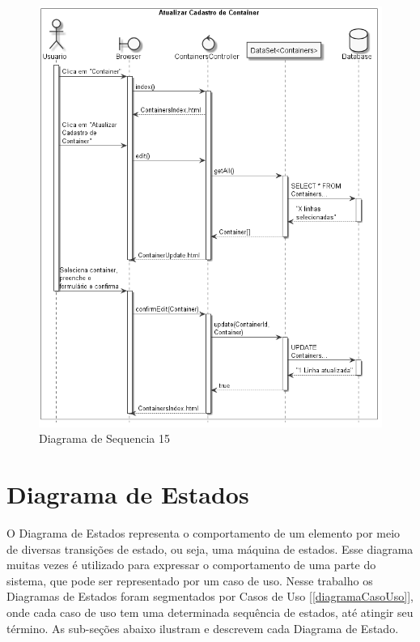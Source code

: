 \documentclass[rascunho,xindy,acronym,symbols]{fei}
\begin{document}
\begin{figure}[H]
    \centering
    \includegraphics[width=\textwidth]{./Images/DS_Atualizar_Cadastro_Container.jpg}
    \caption{Diagrama de Sequencia 15}
    \label{fig:diag_seq15}
\end{figure}

\newpage

\section{Diagrama de Estados} \label{diagramaEstados}

O Diagrama de Estados representa o comportamento de um elemento por meio de diversas transições de estado, ou seja, uma máquina de estados. Esse diagrama muitas vezes é utilizado para expressar o comportamento de uma parte do sistema, que pode ser representado por um caso de uso. Nesse trabalho os Diagramas de Estados foram segmentados por Casos de Uso [\ref{diagramaCasoUso}], onde cada caso de uso tem uma determinada sequência de estados, até atingir seu término. As sub-seções abaixo ilustram e descrevem cada Diagrama de Estado.
\end{document}
